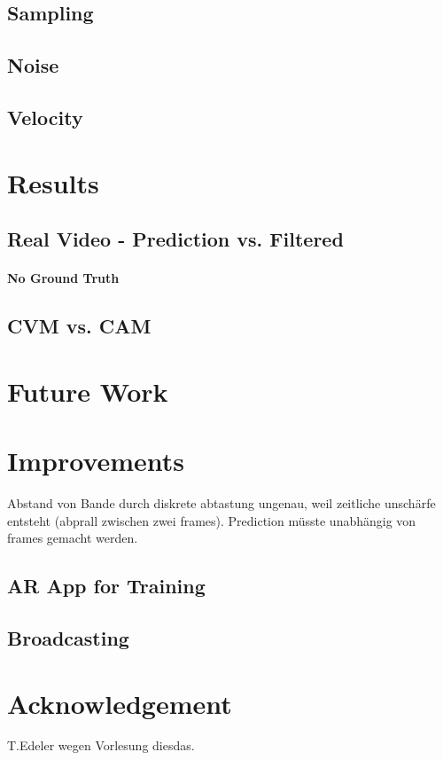 \documentclass[notitlepage, a4paper, 11pt]{scrartcl}
\begin{document}
\begin{multicols}{2}
\subsection{Sampling}
\subsection{Noise}
\subsection{Velocity}

\section{Results}

\subsection{Real Video - Prediction vs. Filtered}
\paragraph{No Ground Truth}
\subsection{CVM vs. CAM}

\section{Future Work}

\section{Improvements}
Abstand von Bande durch diskrete abtastung ungenau, weil zeitliche unschärfe entsteht (abprall zwischen zwei frames).
Prediction müsste unabhängig von frames gemacht werden.


\subsection{AR App for Training}
\subsection{Broadcasting}

\section{Acknowledgement}

T.Edeler wegen Vorlesung diesdas.

\end{multicols}

 

\end{document}
